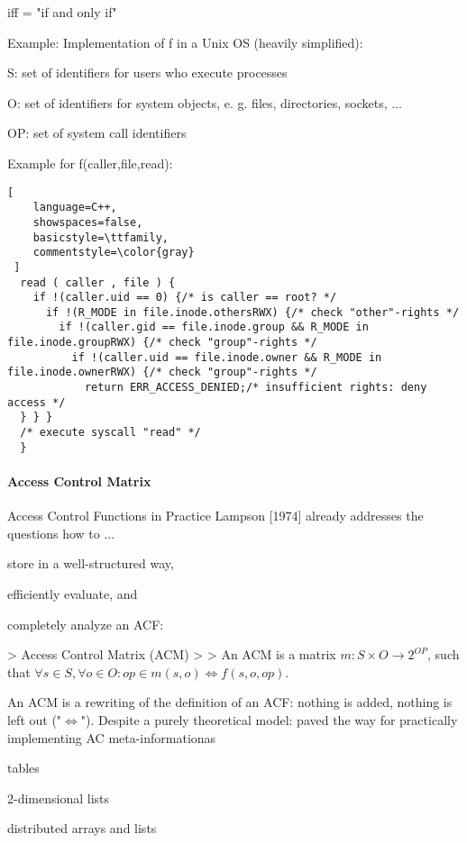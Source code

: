 \documentclass[a4paper]{article}
\begin{document}
\begin{multicols}{3}
    iff = "if and only if"

    Example: Implementation of f in a Unix OS (heavily simplified):
    \begin{itemize*}
        \item S: set of identifiers for users who execute processes
        \item O: set of identifiers for system objects, e. g. files, directories, sockets, ...
        \item OP: set of system call identifiers
    \end{itemize*}

    Example for f(caller,file,read):

    \begin{lstlisting}[
    language=C++,
    showspaces=false,
    basicstyle=\ttfamily,
    commentstyle=\color{gray}
 ]
  read ( caller , file ) {
    if !(caller.uid == 0) {/* is caller == root? */
      if !(R_MODE in file.inode.othersRWX) {/* check "other"-rights */
        if !(caller.gid == file.inode.group && R_MODE in file.inode.groupRWX) {/* check "group"-rights */
          if !(caller.uid == file.inode.owner && R_MODE in file.inode.ownerRWX) {/* check "group"-rights */
            return ERR_ACCESS_DENIED;/* insufficient rights: deny access */
  } } }
  /* execute syscall "read" */
  }
  \end{lstlisting}

    \paragraph{Access Control Matrix}
    Access Control Functions in Practice
    Lampson [1974] already addresses the questions how to ...
    \begin{itemize*}
        \item store in a well-structured way,
        \item efficiently evaluate, and
        \item completely analyze an ACF:
    \end{itemize*}

    > Access Control Matrix (ACM)
    >
    > An ACM is a matrix $m:S\times O \rightarrow 2^{OP}$, such that $\forall s\in S,\forall o\in O:op\in m(s,o)\Leftrightarrow f(s,o,op)$.

    An ACM is a rewriting of the definition of an ACF: nothing is added, nothing is left out ("$\Leftrightarrow$"). Despite a purely theoretical model: paved the way for practically implementing AC meta-informationas
    \begin{itemize*}
        \item tables
        \item 2-dimensional lists
        \item distributed arrays and lists
    \end{itemize*}


\end{multicols}
\end{document}
